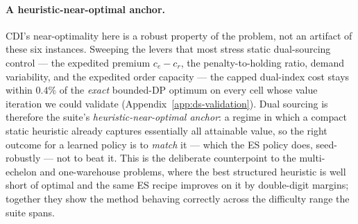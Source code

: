 \documentclass[11pt]{article}
\begin{document}
\paragraph{A heuristic-near-optimal anchor.} CDI's near-optimality here is a robust property of the
problem, not an artifact of these six instances. Sweeping the levers that most stress static
dual-sourcing control --- the expedited premium $c_e-c_r$, the penalty-to-holding ratio, demand
variability, and the expedited order capacity --- the capped dual-index cost stays within $0.4\%$ of
the \emph{exact} bounded-DP optimum on every cell whose value iteration we could validate
(Appendix~\ref{app:ds-validation}). Dual sourcing is therefore the suite's
\emph{heuristic-near-optimal anchor}: a regime in which a compact static heuristic already captures
essentially all attainable value, so the right outcome for a learned policy is to \emph{match} it ---
which the ES policy does, seed-robustly --- not to beat it. This is the deliberate counterpoint to
the multi-echelon and one-warehouse problems, where the best structured heuristic is well short of optimal and
the same ES recipe improves on it by double-digit margins; together they show the method behaving
correctly across the difficulty range the suite spans.
\end{document}
